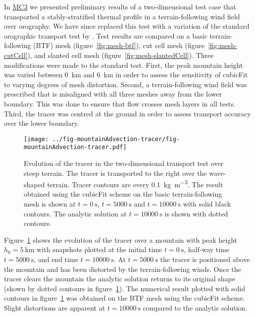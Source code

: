 \documentclass[a4paper,11pt]{article}
\begin{document}
In \href{http://www.datumedge.co.uk/publications/mc-report-2016-05.pdf}{MC3} we presented preliminary results of a two-dimensional test case that transported a stably-stratified thermal profile in a terrain-following wind field over orography.  We have since replaced this test with a variation of the standard orographic transport test by \citet{schaer2002}.
Test results are compared on a basic terrain-following (BTF) mesh (figure~\ref{fig:mesh-btf}), cut cell mesh (figure~\ref{fig:mesh-cutCell}), and slanted cell mesh (figure~\ref{fig:mesh-slantedCell}).  Three modifications were made to the standard test.
First, the peak mountain height was varied between \SI{0}{\kilo\meter} and \SI{6}{\kilo\meter} in order to assess the sensitivity of cubicFit to varying degrees of mesh distortion.
Second, a terrain-following wind field was prescribed that is misaligned with all three meshes away from the lower boundary.  This was done to ensure that flow crosses mesh layers in all tests.
Third, the tracer was centred at the ground in order to assess transport accuracy over the lower boundary.

\begin{figure}
	\centering
	\texttt{[image: ../fig-mountainAdvection-tracer/fig-mountainAdvection-tracer.pdf]}
	\caption{Evolution of the tracer in the two-dimensional transport test over steep terrain.  The tracer is transported to the right over the wave-shaped terrain.  Tracer contours are every \SI{0.1}{\kilo\gram\per\meter\cubed}.  The result obtained using the cubicFit scheme on the basic terrain-following mesh is shown at $t=\SI{0}{\second}$, $t=\SI{5000}{\second}$ and $t=\SI{10000}{\second}$ with solid black contours. The analytic solution at $t=\SI{10000}{\second}$ is shown with dotted contours.}
	\label{fig:mountainAdvection-tracer}
\end{figure}

Figure~\ref{fig:mountainAdvection-tracer} shows the evolution of the tracer over a mountain with peak height $h_0 = \SI{5}{\kilo\meter}$ with snapshots plotted at the initial time $t = \SI{0}{\second}$, half-way time $t = \SI{5000}{\second}$, and end time $t= \SI{10000}{\second}$.  At $t = \SI{5000}{\second}$ the tracer is positioned above the mountain and has been distorted by the terrain-following winds.  Once the tracer clears the mountain the analytic solution returns to its original shape (shown by dotted contours in figure~\ref{fig:mountainAdvection-tracer}).  The numerical result plotted with solid contours in figure~\ref{fig:mountainAdvection-tracer} was obtained on the BTF mesh using the cubicFit scheme.  Slight distortions are apparent at $t = \SI{10000}{\second}$ compared to the analytic solution.
\end{document}
